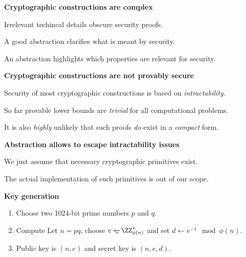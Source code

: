 \documentclass[landscape,footrule]{foils}
\begin{document}
\titlefoil


\begin{triangles}
  \item \textbf{Cryptographic constructions are complex}\vspace*{1ex}
    \begin{diamonds}
      \item Irrelevant techincal details obscure security proofs.
      \item A good abstraction clarifies what is meant by security. 
      \item An abstraction highlights which properties are relevant for security.
      \vspace*{3ex}
    \end{diamonds}
  \item \textbf{Cryptographic constructions are not provably secure}\vspace*{1ex}
    \begin{diamonds}
      \item Security of most cryptographic constructions is based on \emph{intractability}.
      \item So far provable lower bounds are \emph{trivial} for all computational problems. 
      \item It is also \emph{highly} unlikely that such proofs \emph{do} exist in a \emph{compact} form. 
      \vspace*{3ex}
    \end{diamonds}
  \item\textbf{Abstraction allows to escape intractability issues}
    \begin{diamonds}
      \item We just assume that necessary cryptographic primitives exist.
      \item The actual implementation of such primitives is out of our scope.  
    \end{diamonds}
\end{triangles}




\textbf{Key generation} 
\begin{enumerate}
\item Choose two 1024-bit prime numbers $p$ and $q$.
\item Compute Let $n=pq$, choose $e\getsu\ZZ_{\phi(n)}^*$ and set $d\gets e^{-1}\mod \phi(n)$.
\item Public key is $(n,e)$ and secret key is $(n,e,d)$.   
\end{enumerate}
\bigskip
\end{document}
